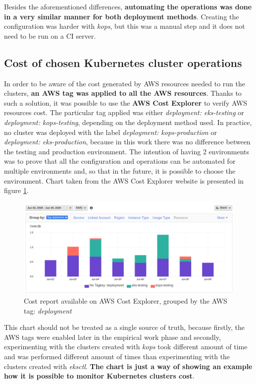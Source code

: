 Besides the aforementioned differences, \textbf{automating the operations was done in a very similar manner for both deployment methods}. Creating the configuration was harder with \textit{kops}, but this was a manual step and it does not need to be run on a CI server.

\subsection{Cost of chosen Kubernetes cluster operations}
In order to be aware of the cost generated by AWS resources needed to run the clusters, \textbf{an AWS tag was applied to all the AWS resources}. Thanks to such a solution, it was possible to use the \textbf{AWS Cost Explorer} to verify AWS resources cost. The particular tag applied was either \textit{deployment: eks-testing} or \textit{deployment: kops-testing}, depending on the deployment method used. In practice, no cluster was deployed with the label \textit{deployment: kops-production} or \textit{deployment: eks-production}, because in this work there was no difference between the testing and production environment. The intention of having 2 environments was to prove that all the configuration and operations can be automated for multiple environments and, so that in the future, it is possible to choose the environment. Chart taken from the AWS Cost Explorer website is presented in figure \ref{aws-cost-explorer}.

\begin{figure}[H]
    \centering
    \includegraphics[width=15cm]{figures/aws-cost-explorer2.png}
    \captionsetup{justification=centering,margin=2cm,width=1.2\linewidth}
    \caption{Cost report available on AWS Cost Explorer, grouped by the AWS tag: \textit{deployment}}
    \label{aws-cost-explorer}
\end{figure}

This chart should not be treated as a single source of truth, because firstly, the AWS tags were enabled later in the empirical work phase and secondly, experimenting with the clusters created with \textit{kops} took different amount of time and was performed different amount of times than experimenting with the clusters created with \textit{eksctl}. \textbf{The chart is just a way of showing an example how it is possible to monitor Kubernetes clusters cost}.

